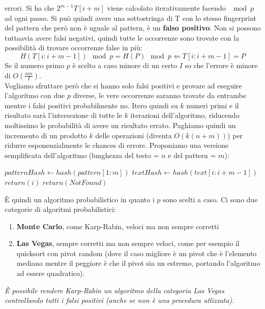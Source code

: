\documentclass[a4paper,12pt, oneside]{book}
\begin{document}
errori. Si ha che $  2^{m-1} T [i + m]$ viene calcolato iterativamente facendo
$\mod p$ ad ogni passo. Si può quindi avere una sottostringa di T con lo stesso
fingerprint del pattern che però non è uguale al pattern,
è un \textbf{falso positivo}. Non si possono tuttaavia avere falsi negativi,
quindi tutte le occorrenze sono trovate con la possibilità di trovare occorrenze
false in più:
\[H(T [i : i + m - 1]) \mod p = H(P) \mod p \Leftarrow T [i : i + m - 1] = P\]
Se il numero primo $p$ è scelto a caso minore di un certo $I$ so che
l'errore è minore di $O(\frac{nm}{I})$.\\
Vogliamo sfruttare però che si hanno solo falsi positivi e provare ad
eseguire l'algoritmo con due $p$ diverse, le vere occorrenze saranno
trovate da entrambe mentre i falsi positivi probabilmente no. Itero
quindi su $k$ numeri primi e il risultato sarà l'intersezione di tutte
le $k$ iterazioni dell'algoritmo, riducendo moltissimo le probabilità di
avere un risultato errato. Paghiamo quindi un incremento di un prodotto
$k$ delle operazioni (diventa $O(k(n+m))$) per ridurre esponenzialmente
le chances di errore.
\newpage
Proponiamo una versione semplificata dell'algoritmo (lunghezza del
testo = $n$ e del pattern = $m$):
\begin{shaded}
  \begin{algorithm}
    \State $patternHash \gets hash(pattern[1:m])$
    \State $textHash \gets hash(text[i : i + m - 1])$
    \State $return(i)$
    \EndIf
    \EndIf
    \EndFor
    \State $return(NotFound)$
    \EndFunction
  \end{algorithm}
\end{shaded}
È quindi un algoritmo probabilistico in quanto i $p$ sono scelti a
caso. Ci sono due categorie di algoritmi probabilistici:
\begin{enumerate}
  \item \textbf{Monte Carlo}, come Karp-Rabin, veloci ma non sempre
  corretti
  \item \textbf{Las Vegas}, sempre corretti ma non sempre veloci, come
  per esempio il quicksort con pivot random (dove il caso migliore è un 
  pivot che è l'elemento mediano mentre il peggiore è che il pivot 
  sia un estremo, portando l'algoritmo ad essere quadratico).
\end{enumerate}
\textit{È possibile rendere Karp-Rabin un algoritmo della categoria Las Vegas
  controllando tutti i falsi positivi (anche se non è una procedura utlizzata).}
\end{document}
